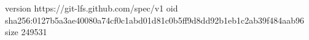 version https://git-lfs.github.com/spec/v1
oid sha256:0127b5a3ae40080a74cf0c1abd01d81c0b5ff9d8dd92b1eb1c2ab39f484aab96
size 249531

